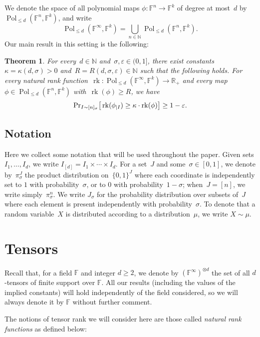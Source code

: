 \documentclass[10pt]{article}
\newtheorem{theorem}{Theorem}[section]
\renewcommand{\Pr}{\mbox{\rm Pr}}
\newcommand{\R}{\mathbb{R}}
\newcommand{\N}{\mathbb{N}}
\newcommand{\F}{\mathbb{F}}
\newcommand{\1}{\mathbf{1}}
\newcommand{\eps}{\varepsilon}
\DeclareMathOperator{\rank}{rk}
\DeclareMathOperator{\Pol}{Pol}
\newcommand{\beqn}{\begin{equation*}}
\newcommand{\eeqn}{\end{equation*}}
\begin{document}
We denote the space of all polynomial maps $\phi: \F^n\to\F^k$ of degree at most~$d$ by $\Pol_{\leq d}(\F^n, \F^k)$, and write
\beqn
\Pol_{\leq d}(\F^{\infty}, \F^k) = \bigcup_{n\in \N} \Pol_{\leq d}(\F^n, \F^k).
\eeqn
Our main result in this setting is the following:

\begin{theorem} \label{thm:random_poly}
For every~$d\in \N$ and~$\sigma,\eps\in (0,1]$, there exist constants~$\kappa = \kappa(d, \sigma)>0$ and~$R = R(d,\sigma,\eps)\in\N$ such that the following holds.
For every natural rank function~$\rank: \Pol_{\leq d}(\F^{\infty}, \F^k) \to \R_+$ and every map~$\phi \in \Pol_{\leq d}(\F^n, \F^k)$ with~$\rank(\phi) \geq R$, we have
\beqn
\Pr_{I\sim [n]_{\sigma}}\big[ \rank(\phi_{|I}) \geq \kappa\cdot \rank(\phi)\big] \geq 1 - \eps.
\eeqn
\end{theorem}
\setcounter{subsection}{2}
\subsection{Notation}
\label{sec:prelims}

Here we collect some notation that will be used throughout the paper.
Given sets  $I_1, \dots, I_d$, we write $I_{[d]} = I_1\times \cdots\times I_d$.
For a set~$J$ and some~$\sigma \in [0,1]$, we denote by~$\pi_{\sigma}^J$ the product distribution on~$\{0,1\}^J$ where each coordinate is independently set to $1$ with probability~$\sigma$, or to $0$ with probability~$1-\sigma$;
when~$J=[n]$, we write simply~$\pi_{\sigma}^n$.
We write $J_\sigma$ for the probability distribution over subsets of~$J$ where each element is present independently with probability~$\sigma$.
To denote that a random variable~$X$ is distributed according to a distribution~$\mu$, we write $X\sim \mu$.
\section{Tensors}
\label{sec:tensors}

Recall that, for a field $\F$ and integer $d\geq 2$, we denote by $(\F^\infty)^{\otimes d}$ the set of all $d$-tensors of finite support over $\F$.
All our results (including the values of the implied constants) will hold independently of the field considered, so we will always denote it by $\F$ without further comment.

The notions of tensor rank we will consider here are those called \emph{natural rank functions} as defined below:
\end{document}
